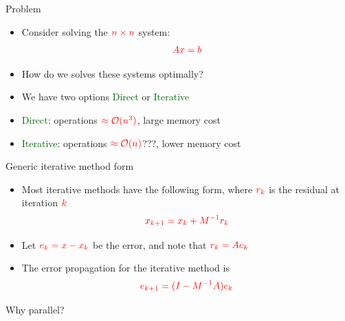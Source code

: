 \documentclass[12pt]{beamer}
\newcommand{\gr}[1]{\textcolor{darkgreen} {#1}}
\newcommand{\re}[1]{{\textcolor{red}       {#1}}}
\begin{document}
\begin{frame}{Problem}
\begin{itemize}
  \item Consider solving the $\re{n\times n}$ system:
  $$\re{Ax = b}$$
  \item How do we solves these systems optimally?
  \pause
  \vspace{2mm}
  \item We have two options \gr{Direct} or \gr{Iterative}
  \item \gr{Direct}: operations $\re{\approx \mathcal{O}(n^3)}$, large memory cost
  \item \gr{Iterative}: operations $\re{\approx \mathcal{O}(n)}$???, lower memory cost
\end{itemize}

\end{frame}

\begin{frame}{Generic iterative method form}
\begin{itemize}
  \item Most iterative methods have the following form, where $\re{r_k}$ is the residual at iteration $\re{k}$
  $$\re{x_{k+1} = x_k + M^{-1}r_k}$$
  \item Let $\re{e_k =x - x_k}$ be the error, and note that $\re{r_k = Ae_k}$
  \item The error propagation for the iterative method is
  $$\re{e_{k+1} = (I-M^{-1}A)e_k}$$
\end{itemize}
\end{frame}

\begin{frame}{Why parallel?}


\end{frame}
\end{document}
